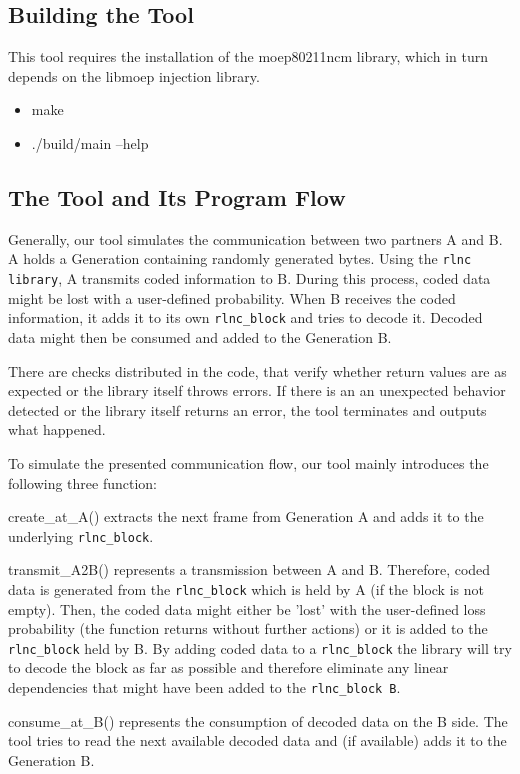 \documentclass[a4paper,english,10pt]{tumarticle}
\begin{document}
\subsection{Building the Tool}\label{app:build}
This tool requires the installation of the moep80211ncm library, which in turn depends on the libmoep injection library. 

\begin{itemize}
  \item make
  \item ./build/main --help
\end{itemize}

\subsection{The Tool and Its Program Flow}\label{sec:tool}
Generally, our tool simulates the communication between two partners A and B. 
A holds a Generation containing randomly generated bytes. Using the \texttt{rlnc library}, A transmits coded information to B. 
During this process, coded data might be lost with a user-defined probability. When B receives the coded information, 
it adds it to its own \texttt{rlnc\_block} and tries to decode it. Decoded data might then be consumed and added to the Generation B.

There are checks distributed in the code, that verify whether return values are as expected or 
the library itself throws errors. If there is an an unexpected behavior detected or the library itself returns an error, 
the tool terminates and outputs what happened.

To simulate the presented communication flow, our tool mainly introduces the following three function:

create\_at\_A() extracts the next frame from Generation A and adds it to the underlying \texttt{rlnc\_block}. 

transmit\_A2B() represents a transmission between A and B. Therefore, coded data is generated from the 
\texttt{rlnc\_block} which is held by A (if the block is not empty). Then, the coded data might either be 'lost' 
with the user-defined loss probability (the function returns without further actions)
or it is added to the \texttt{rlnc\_block} held by B. By adding coded data to a \texttt{rlnc\_block} the library will try to decode the block as far as possible
and therefore eliminate any linear dependencies that might have been added to the \texttt{rlnc\_block B}.

consume\_at\_B() represents the consumption of decoded data on the B side. 
The tool tries to read the next available decoded data and (if available) adds it to the Generation B.
\end{document}
